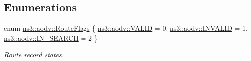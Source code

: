 \subsection*{Enumerations}
\begin{DoxyCompactItemize}
\item 
enum \hyperlink{group__aodv_ga44216921a9c725a5ab8bc19059052a26}{ns3\+::aodv\+::\+Route\+Flags} \{ \hyperlink{group__aodv_gga44216921a9c725a5ab8bc19059052a26af5fecee96bb2650aa417994840b43c99}{ns3\+::aodv\+::\+V\+A\+L\+ID} = 0, 
\hyperlink{group__aodv_gga44216921a9c725a5ab8bc19059052a26a0d7b8118b2af9344a91683148f1261c3}{ns3\+::aodv\+::\+I\+N\+V\+A\+L\+ID} = 1, 
\hyperlink{group__aodv_gga44216921a9c725a5ab8bc19059052a26aba44cda5a5df371b6567f70d7d8311fa}{ns3\+::aodv\+::\+I\+N\+\_\+\+S\+E\+A\+R\+CH} = 2
 \}\begin{DoxyCompactList}\small\item\em Route record states. \end{DoxyCompactList}
\end{DoxyCompactItemize}
